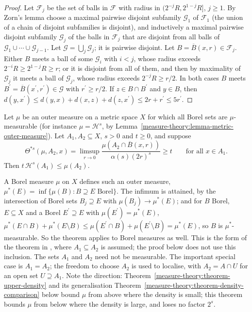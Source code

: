 \begin{proof}
Let $\mathcal{F}_j$ be the set of balls in $\mathcal{F}$ with radius in $(2^{-j}R, 2^{1-j}R]$, $j \geq 1$. By Zorn's lemma choose a maximal pairwise disjoint subfamily $\mathcal{G}_1$ of $\mathcal{F}_1$ (the union of a chain of
disjoint subfamilies is disjoint), and inductively a maximal pairwise disjoint subfamily $\mathcal{G}_j$ of the balls in $\mathcal{F}_j$ that are disjoint from all balls of
$\mathcal{G}_1 \cup \cdots \cup \mathcal{G}_{j-1}$. Let $\mathcal{G} = \bigcup_j\mathcal{G}_j$; it is pairwise disjoint. Let $B = \overline{B}(x, r) \in \mathcal{F}_j$. Either $B$ meets a ball of some $\mathcal{G}_i$ with $i < j$,
whose radius exceeds $2^{-i}R \geq 2^{1-j}R \geq r$; or it is disjoint from all of them, and then by maximality of $\mathcal{G}_j$ it meets a ball of $\mathcal{G}_j$, whose radius exceeds $2^{-j}R \geq r/2$. In both
cases $B$ meets $B^{\prime} = \overline{B}(x^{\prime}, r^{\prime}) \in \mathcal{G}$ with $r^{\prime} \geq r/2$. If $z \in B \cap B^{\prime}$ and $y \in B$, then
$d(y, x^{\prime}) \leq d(y, x) + d(x, z) + d(z, x^{\prime}) \leq 2r + r^{\prime} \leq 5r^{\prime}$.
\end{proof}

\begin{theorem}\label{measure-theory:theorem-density-lower-comparison}
Let $\mu$ be an outer measure on a metric space $X$ for which all Borel sets are $\mu$-measurable (for instance $\mu = \mathcal{H}^s$, by Lemma~\ref{measure-theory:lemma-metric-outer-measure}). Let
$A_1, A_2 \subseteq X$, $s > 0$ and $t \geq 0$, and suppose
\[
\Theta^{*s}(\mu, A_2, x) = \limsup_{r \to 0}\frac{\mu(A_2 \cap \overline{B}(x, r))}{\alpha(s)(2r)^s} \geq t \qquad \text{for all } x \in A_1 .
\]
Then $t\,\mathcal{H}^s(A_1) \leq \mu(A_2)$.
\end{theorem}

A Borel measure $\mu$ on $X$ defines such an outer measure, $\mu^*(E) = \inf\{\mu(B) : B \supseteq E \text{ Borel}\}$. The infimum is attained, by the intersection of Borel sets $B_j \supseteq E$ with
$\mu(B_j) \to \mu^*(E)$; and for $B$ Borel, $E \subseteq X$ and a Borel $E^{\prime} \supseteq E$ with $\mu(E^{\prime}) = \mu^*(E)$,
$\mu^*(E \cap B) + \mu^*(E \setminus B) \leq \mu(E^{\prime} \cap B) + \mu(E^{\prime} \setminus B) = \mu^*(E)$, so $B$ is $\mu^*$-measurable. So the theorem applies to Borel measures as well.
This is the form of the theorem in \cite{simon-gmt}, where $A_1 \subseteq A_2$ is assumed; the proof below does not use this inclusion. The sets $A_1$ and $A_2$ need not be measurable. The
important special case is $A_1 = A_2$; the freedom to choose $A_2$ is used to localise, with $A_2 = A \cap U$ for an open set $U \supseteq A_1$. Note the direction: Theorem~\ref{measure-theory:theorem-upper-density} and its generalisation Theorem~\ref{measure-theory:theorem-density-comparison} below bound $\mu$ from above where the density is small;
this theorem bounds $\mu$ from below where the density is large, and loses no factor $2^s$.

